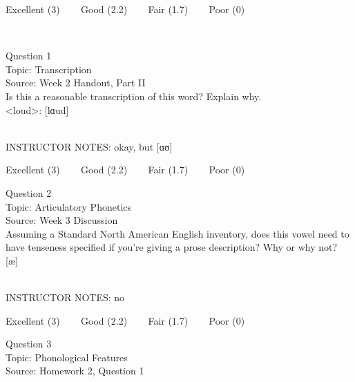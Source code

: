 \documentclass[12pt]{article}
\begin{document}
\vfill
Excellent (3) ~~~ Good (2.2) ~~~ Fair (1.7) ~~~ Poor (0)
\newpage

\begin{center}
\textbf{{\color{red}{\HUGE END OF EXAM}}}\\

\end{center}
\newpage

\begin{center}
\textbf{{\color{blue}{\HUGE START OF EXAM\\}}}

\textbf{{\color{blue}{\HUGE Student ID: 80138\\}}}

\textbf{{\color{blue}{\HUGE \\}}}

\end{center}
\newpage

{\large Question 1}\\

Topic: Transcription\\
Source: Week 2 Handout, Part II\\

Is this a reasonable transcription of this word? Explain why.\\

<loud>: {[lɑud]}


~\\
INSTRUCTOR NOTES: okay, but [ɑʊ]


\vfill
Excellent (3) ~~~ Good (2.2) ~~~ Fair (1.7) ~~~ Poor (0)
\newpage

{\large Question 2}\\

Topic: Articulatory Phonetics\\
Source: Week 3 Discussion\\

Assuming a Standard North American English inventory, does this vowel need to have tenseness specified if you're giving a prose description? Why or why not?\\

{[æ]}


~\\
INSTRUCTOR NOTES: no


\vfill
Excellent (3) ~~~ Good (2.2) ~~~ Fair (1.7) ~~~ Poor (0)
\newpage

{\large Question 3}\\

Topic: Phonological Features\\
Source: Homework 2, Question 1\\
\end{document}
